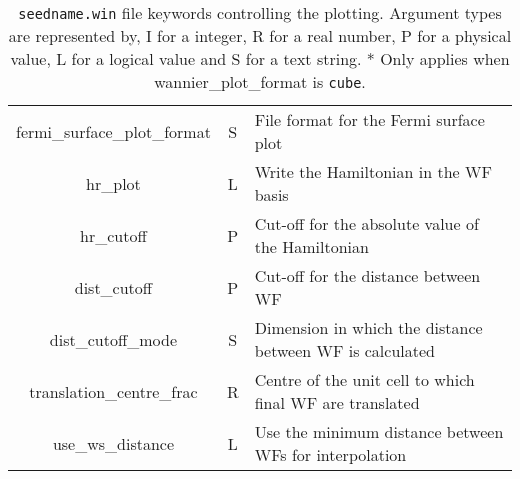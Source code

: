 \begin{table}
\begin{center}
\begin{tabular}{|c|c|p{6cm}|}
  {\sc fermi\_surface\_plot\_format }   & S & File format for the Fermi
  surface plot \\
  {\sc hr\_plot} & L & Write the Hamiltonian in the WF basis \\
  {\sc hr\_cutoff} & P &  Cut-off for the absolute value of the Hamiltonian \\
  {\sc dist\_cutoff} & P & Cut-off for the distance between WF \\
  {\sc dist\_cutoff\_mode} & S & Dimension in which the distance between WF
  is calculated \\
  {\sc translation\_centre\_frac } & R & Centre of the unit cell to which
  final WF are translated \\ 
  {\sc use\_ws\_distance } & L & Use the minimum distance between WFs for interpolation \\
\hline
\end{tabular}
\caption[Parameter file keywords controlling plotting.]
{{\tt seedname.win} file keywords controlling the  plotting.  Argument types
are represented by, I for a integer, R for a real number, P for a
physical value, L for a logical value and S for a text string. * Only
applies when {\sc wannier\_plot\_format} is {\tt cube}.}
\label{parameter_keywords6}
\end{center}
\end{table}



